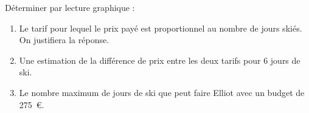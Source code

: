 \begin{enumerate}
		Déterminer par lecture graphique :
		\begin{enumerate}
			\item Le tarif pour lequel le prix payé est proportionnel au nombre de jours skiés. On justifiera la réponse.
			
			\item Une estimation de la différence de prix entre les deux tarifs pour 6 jours de ski.
			
			\item Le nombre maximum de jours de ski que peut faire Elliot avec un budget de 275~\euro.
		\end{enumerate}

		\end{enumerate}

\vspace{0,5cm}

